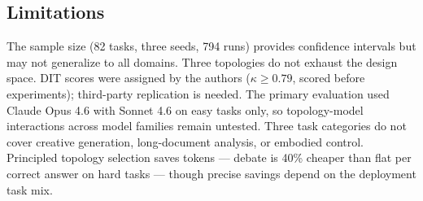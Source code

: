 \subsection{Limitations}\label{sec:discussion-limitations}

The sample size (82 tasks, three seeds, 794 runs) provides confidence intervals but may not generalize to all domains. Three topologies do not exhaust the design space. DIT scores were assigned by the authors ($\kappa \geq 0.79$, scored before experiments); third-party replication is needed. The primary evaluation used Claude Opus 4.6 with Sonnet 4.6 on easy tasks only, so topology-model interactions across model families remain untested. Three task categories do not cover creative generation, long-document analysis, or embodied control. Principled topology selection saves tokens --- debate is 40\% cheaper than flat per correct answer on hard tasks --- though precise savings depend on the deployment task mix.

